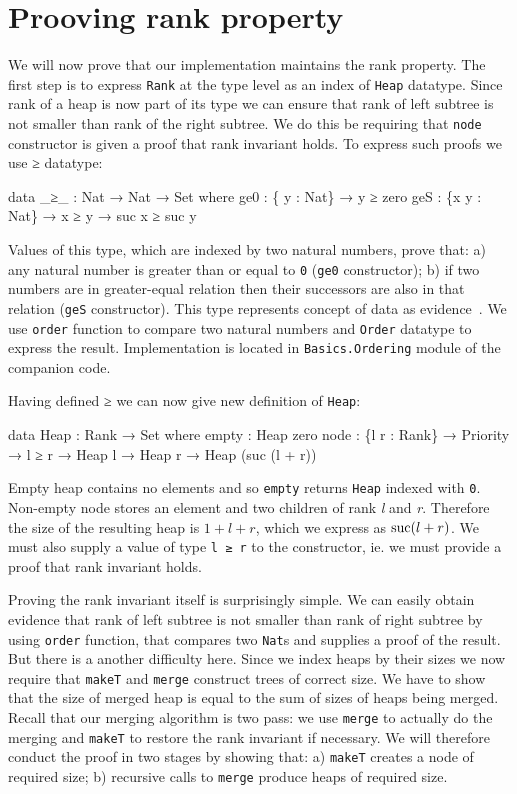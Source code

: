 \section[Prooving rank property]{Prooving rank property} \label{sec:rank-property}

We will now prove that our implementation maintains the rank property. The first step is to express \texttt{Rank} at the type level as an index of \texttt{Heap} datatype. Since rank of a heap is now part of its type we can ensure that rank of left subtree is not smaller than rank of the right subtree. We do this be requiring that \texttt{node} constructor is given a proof that rank invariant holds. To express such proofs we use ≥ datatype:

\begin{code}
data _≥_ : Nat → Nat → Set where
  ge0 : \{  y : Nat\} → y     ≥ zero
  geS : \{x y : Nat\} → x ≥ y → suc x ≥ suc y
\end{code}
\noindent
Values of this type, which are indexed by two natural numbers, prove that: a) any natural number is greater than or equal to \texttt{0} (\texttt{ge0} constructor); b) if two numbers are in greater-equal relation then their successors are also in that relation (\texttt{geS} constructor). This type represents concept of data as evidence~\cite{AltMcBMcK05}. We use \texttt{order} function to compare two natural numbers and \texttt{Order} datatype to express the result. Implementation is located in \texttt{Basics.Ordering} module of the companion code.

Having defined ≥ we can now give new definition of \texttt{Heap}:

\begin{code}
data Heap : Rank → Set where
  empty : Heap zero
  node  : \{l r : Rank\} → Priority → l ≥ r →
          Heap l → Heap r → Heap (suc (l + r))
\end{code}

\noindent
Empty heap contains no elements and so \texttt{empty} returns \texttt{Heap} indexed with \texttt{0}. Non-empty node stores an element and two children of rank \textit{l} and \textit{r}. Therefore the size of the resulting heap is $1 + l + r$, which we express as $\operatorname{suc}(l + r)$. We must also supply a value of type \texttt{l ≥ r} to the constructor, ie. we must provide a proof that rank invariant holds.

Proving the rank invariant itself is surprisingly simple. We can easily obtain evidence that rank of left subtree is not smaller than rank of right subtree by using \texttt{order} function, that compares two \texttt{Nat}s and supplies a proof of the result. But there is a another difficulty here. Since we index heaps by their sizes we now require that \texttt{makeT} and \texttt{merge} construct trees of correct size. We have to show that the size of merged heap is equal to the sum of sizes of heaps being merged. Recall that our merging algorithm is two pass: we use \texttt{merge} to actually do the merging and \texttt{makeT} to
restore the rank invariant if necessary. We will therefore conduct the proof in two stages by showing that: a) \texttt{makeT} creates a node of required size; b) recursive calls to \texttt{merge} produce heaps of required size.

